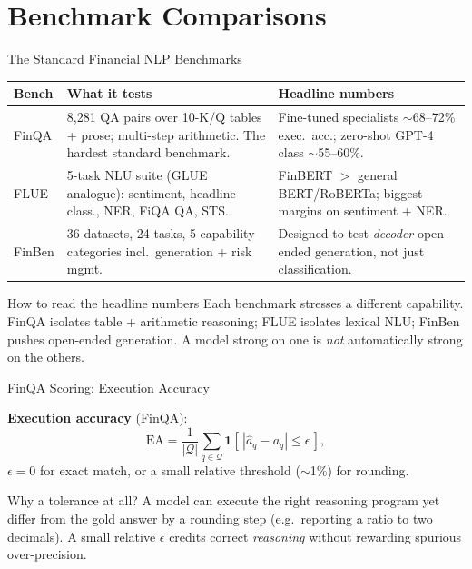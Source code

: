 \documentclass[9pt,t]{beamer}
\begin{document}
\section{Benchmark Comparisons}

\begin{frame}{The Standard Financial NLP Benchmarks}
\small
\begin{tabular}{p{}p{}p{}}
\toprule
\textbf{Bench} & \textbf{What it tests} & \textbf{Headline numbers} \\
\midrule
FinQA & 8{,}281 QA pairs over 10-K/Q tables + prose; multi-step arithmetic. The hardest standard benchmark. & Fine-tuned specialists $\sim$68--72\% exec.\ acc.; zero-shot GPT-4 class $\sim$55--60\%. \\[4pt]
FLUE & 5-task NLU suite (GLUE analogue): sentiment, headline class., NER, FiQA QA, STS. & FinBERT $>$ general BERT/RoBERTa; biggest margins on sentiment + NER. \\[4pt]
FinBen & 36 datasets, 24 tasks, 5 capability categories incl.\ generation + risk mgmt. & Designed to test \emph{decoder} open-ended generation, not just classification. \\
\bottomrule
\end{tabular}

\medskip
\begin{block}{How to read the headline numbers}
Each benchmark stresses a different capability. FinQA isolates table + arithmetic
reasoning; FLUE isolates lexical NLU; FinBen pushes open-ended generation. A model
strong on one is \emph{not} automatically strong on the others.
\end{block}
\end{frame}

\begin{frame}{FinQA Scoring: Execution Accuracy}
\begin{underhood}
\textbf{Execution accuracy} (FinQA):
\[
  \mathrm{EA} = \frac{1}{|\mathcal{Q}|}\sum_{q\in\mathcal{Q}}
  \mathbf{1}\!\left[\,|\hat a_q - a_q| \le \epsilon\,\right],
\]
$\epsilon = 0$ for exact match, or a small relative threshold ($\sim$1\%) for rounding.
\end{underhood}

\medskip
\begin{block}{Why a tolerance at all?}
A model can execute the right reasoning program yet differ from the gold answer by a
rounding step (e.g.\ reporting a ratio to two decimals). A small relative $\epsilon$
credits correct \emph{reasoning} without rewarding spurious over-precision.
\end{block}
\end{frame}
\end{document}
